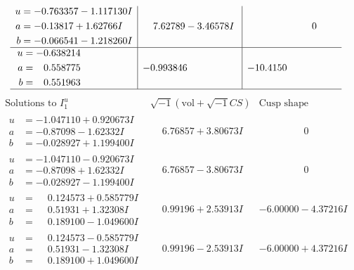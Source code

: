 \documentclass[1p]{elsarticle_modified}
\theoremstyle{definition}
\newcommand{\I}{\sqrt{-1}}
\begin{document}
$$\begin{array}{c|c|c}
\begin{aligned}
u &= -0.763357 - 1.117130 I \\
a &= -0.13817 + 1.62766 I \\
b &= -0.066541 - 1.218260 I\end{aligned}
 & \phantom{-}7.62789 - 3.46578 I & \phantom{-0.000000 } 0 \\ \hline\begin{aligned}
u &= -0.638214\phantom{ +0.000000I} \\
a &= \phantom{-}0.558775\phantom{ +0.000000I} \\
b &= \phantom{-}0.551963\phantom{ +0.000000I}\end{aligned}
 & -0.993846\phantom{ +0.000000I} & -10.4150\phantom{ +0.000000I}\\
 \hline 
 \end{array}$$\newpage$$\begin{array}{c|c|c}  
\text{Solutions to }I^u_{1}& \I (\text{vol} + \sqrt{-1}CS) & \text{Cusp shape}\\
 \hline 
\begin{aligned}
u &= -1.047110 + 0.920673 I \\
a &= -0.87098 - 1.62332 I \\
b &= -0.028927 + 1.199400 I\end{aligned}
 & \phantom{-}6.76857 + 3.80673 I & \phantom{-0.000000 } 0 \\ \hline\begin{aligned}
u &= -1.047110 - 0.920673 I \\
a &= -0.87098 + 1.62332 I \\
b &= -0.028927 - 1.199400 I\end{aligned}
 & \phantom{-}6.76857 - 3.80673 I & \phantom{-0.000000 } 0 \\ \hline\begin{aligned}
u &= \phantom{-}0.124573 + 0.585779 I \\
a &= \phantom{-}0.51931 + 1.32308 I \\
b &= \phantom{-}0.189100 - 1.049600 I\end{aligned}
 & \phantom{-}0.99196 + 2.53913 I & -6.00000 - 4.37216 I \\ \hline\begin{aligned}
u &= \phantom{-}0.124573 - 0.585779 I \\
a &= \phantom{-}0.51931 - 1.32308 I \\
b &= \phantom{-}0.189100 + 1.049600 I\end{aligned}
 & \phantom{-}0.99196 - 2.53913 I & -6.00000 + 4.37216 I \\ \hline\begin{aligned}

\end{aligned}
\end{array}$$
\end{document}
